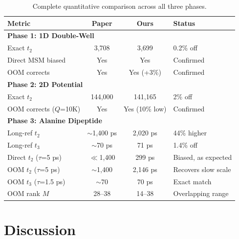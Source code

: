 \documentclass[11pt,a4paper]{article}
\begin{document}
\begin{table}[H]
\centering
\caption{Complete quantitative comparison across all three phases.}
\label{tab:full_comparison}
\begin{tabular}{lccl}
\toprule
Metric & Paper & Ours & Status \\
\midrule
\multicolumn{4}{l}{\textbf{Phase 1: 1D Double-Well}} \\
\quad Exact $t_2$ & 3{,}708 & 3{,}699 & \textcolor{green!50!black}{0.2\% off} \\
\quad Direct MSM biased & Yes & Yes & \textcolor{green!50!black}{Confirmed} \\
\quad OOM corrects & Yes & Yes (+3\%) & \textcolor{green!50!black}{Confirmed} \\
\midrule
\multicolumn{4}{l}{\textbf{Phase 2: 2D Potential}} \\
\quad Exact $t_2$ & 144{,}000 & 141{,}165 & \textcolor{green!50!black}{2\% off} \\
\quad OOM corrects ($Q$=10K) & Yes & Yes (10\% low) & \textcolor{green!50!black}{Confirmed} \\
\midrule
\multicolumn{4}{l}{\textbf{Phase 3: Alanine Dipeptide}} \\
\quad Long-ref $t_2$ & $\sim$1{,}400 ps & 2{,}020 ps & \textcolor{orange!80!black}{44\% higher} \\
\quad Long-ref $t_3$ & $\sim$70 ps & 71 ps & \textcolor{green!50!black}{1.4\% off} \\
\quad Direct $t_2$ ($\tau$=5 ps) & $\ll$1{,}400 & 299 ps & \textcolor{green!50!black}{Biased, as expected} \\
\quad OOM $t_2$ ($\tau$=5 ps) & $\sim$1{,}400 & 2{,}146 ps & \textcolor{green!50!black}{Recovers slow scale} \\
\quad OOM $t_3$ ($\tau$=1.5 ps) & $\sim$70 & 70 ps & \textcolor{green!50!black}{Exact match} \\
\quad OOM rank $M$ & 28--38 & 14--38 & \textcolor{green!50!black}{Overlapping range} \\
\bottomrule
\end{tabular}
\end{table}

\section{Discussion}
\end{document}
